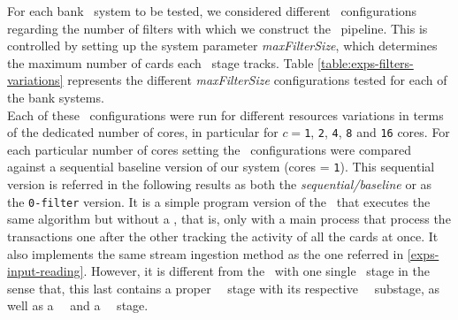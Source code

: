 For each bank \DPATM\ system to be tested, we considered different \DPATM\ configurations 
regarding the number of filters with which we construct the \DP\ pipeline. 
This is controlled by setting up the system parameter \emph{maxFilterSize}, which determines the maximum number of cards each \filter\ stage tracks. 
Table \ref{table:exps-filters-variations} represents the different \emph{maxFilterSize} configurations tested for each of the bank systems.\\

Each of these \DPATM\ configurations were run for different resources variations in terms of the dedicated number of cores, 
in particular for $c = $\texttt{1}, \texttt{2}, \texttt{4}, \texttt{8} and \texttt{16} cores. 
For each particular number of cores setting the \DPATM\ configurations were compared against a sequential baseline version of our system (cores = \texttt{1}). 
This sequential version is referred in the following results as both the \textit{sequential/baseline} or as the \texttt{0-filter} version. 
It is a simple program version of the \DPATM\ that executes the same algorithm but without a \DP, that is, only with a main process that process the transactions one after the other tracking the activity of all the cards at once. It also implements the same stream ingestion method as the one referred in \ref{exps-input-reading}. However, it is different from the \DPATM\ with one single \filter\ stage in the sense that, this last contains a proper \filter\ \F\ stage with its respective \filterworker\ \FW\ substage, as well as a \source\ \Sr\ and a \sink\ \Sk\ stage.

